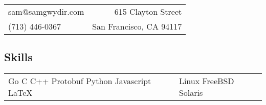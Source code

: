 \documentclass[resmargin,line,12pt]{res}
\begin{document}
\hfill
\vspace*{-.45in}
\begin{tabular}{l r}
sam@samgwydir.com & 615 Clayton Street\\
(713) 446-0367 & San Francisco, CA 94117
\end{tabular}

\vspace*{.1in}
{\color{Black}
\begin{resume}

\vspace*{.05in}
{\color{Black}
  \vspace{-.10in}
  \section{\sc Skills}}
\hspace{-.35in}
{\renewcommand{\arraystretch}{1.25}
  \renewcommand{\tabcolsep}{0.575cm}
  \begin{tabular}{l l}
    Go C C++ Protobuf Python Javascript \LaTeX{} & Linux FreeBSD Solaris \\
  \end{tabular}}



\end{resume}}
\end{document}
